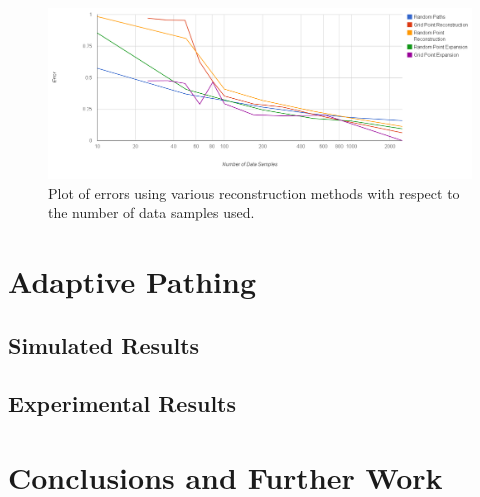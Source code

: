 \documentclass[english]{article}\usepackage[]{graphicx}\usepackage[]{color}
\begin{document}
\begin{figure}
  \centering
    \includegraphics[width=1\textwidth]{figures/othermethoderror}
  \caption{Plot of errors using various reconstruction methods with respect to the number of data samples used.}
  \label{fig:othermethoderror}
\end{figure}

\section{Adaptive Pathing}

\subsection{Simulated Results}
\subsection{Experimental Results}

\section{Conclusions and Further Work}

\newpage


\end{document}
